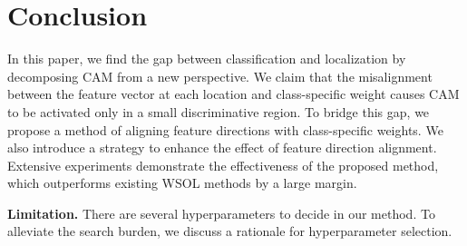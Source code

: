 \section{Conclusion}
In this paper, we find the gap between classification and localization by decomposing CAM from a new perspective. We claim that the misalignment between the feature vector at each location and class-specific weight causes CAM to be activated only in a small discriminative region.
To bridge this gap, we propose a method of aligning feature directions with class-specific weights. We also introduce a strategy to enhance the effect of feature direction alignment.
Extensive experiments demonstrate the effectiveness of the proposed method, which outperforms existing WSOL methods by a large margin.

\noindent\textbf{Limitation.}
There are several hyperparameters to decide in our method. To alleviate the search burden, we discuss a rationale for hyperparameter selection.